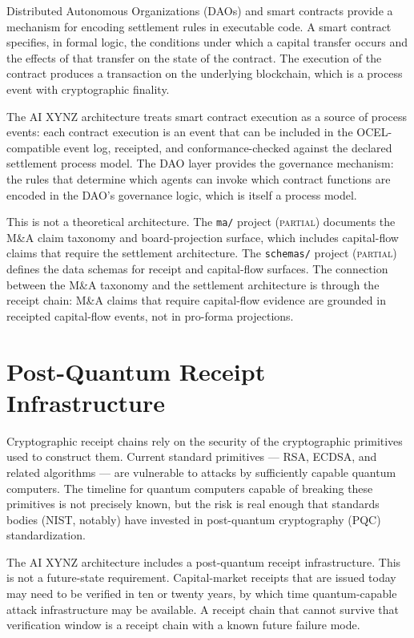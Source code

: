 Distributed Autonomous Organizations (DAOs) and smart contracts provide a mechanism for encoding settlement rules in executable code. A smart contract specifies, in formal logic, the conditions under which a capital transfer occurs and the effects of that transfer on the state of the contract. The execution of the contract produces a transaction on the underlying blockchain, which is a process event with cryptographic finality.

The AI XYNZ architecture treats smart contract execution as a source of process events: each contract execution is an event that can be included in the OCEL-compatible event log, receipted, and conformance-checked against the declared settlement process model. The DAO layer provides the governance mechanism: the rules that determine which agents can invoke which contract functions are encoded in the DAO's governance logic, which is itself a process model.

This is not a theoretical architecture. The \texttt{ma/} project (\textsc{partial}) documents the M\&A claim taxonomy and board-projection surface, which includes capital-flow claims that require the settlement architecture. The \texttt{schemas/} project (\textsc{partial}) defines the data schemas for receipt and capital-flow surfaces. The connection between the M\&A taxonomy and the settlement architecture is through the receipt chain: M\&A claims that require capital-flow evidence are grounded in receipted capital-flow events, not in pro-forma projections.

\section{Post-Quantum Receipt Infrastructure}

Cryptographic receipt chains rely on the security of the cryptographic primitives used to construct them. Current standard primitives --- RSA, ECDSA, and related algorithms --- are vulnerable to attacks by sufficiently capable quantum computers. The timeline for quantum computers capable of breaking these primitives is not precisely known, but the risk is real enough that standards bodies (NIST, notably) have invested in post-quantum cryptography (PQC) standardization.

The AI XYNZ architecture includes a post-quantum receipt infrastructure. This is not a future-state requirement. Capital-market receipts that are issued today may need to be verified in ten or twenty years, by which time quantum-capable attack infrastructure may be available. A receipt chain that cannot survive that verification window is a receipt chain with a known future failure mode.


